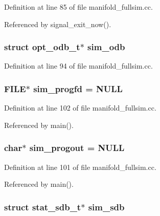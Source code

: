 Definition at line 85 of file manifold\_\-fullsim.cc.

Referenced by signal\_\-exit\_\-now().
\subsubsection[{sim\_\-odb}]{\setlength{\rightskip}{0pt plus 5cm}struct {\bf opt\_\-odb\_\-t}$\ast$ {\bf sim\_\-odb}}\label{manifold__fullsim_8cc_5520d419f4ed203a8f4496330bef06e3}




Definition at line 94 of file manifold\_\-fullsim.cc.
\subsubsection[{sim\_\-progfd}]{\setlength{\rightskip}{0pt plus 5cm}FILE$\ast$ {\bf sim\_\-progfd} = NULL}\label{manifold__fullsim_8cc_f93f90c77918d1b430318725f0f607a8}




Definition at line 102 of file manifold\_\-fullsim.cc.

Referenced by main().
\subsubsection[{sim\_\-progout}]{\setlength{\rightskip}{0pt plus 5cm}char$\ast$ {\bf sim\_\-progout} = NULL}\label{manifold__fullsim_8cc_21fe317600267fa77e054df4355779dc}




Definition at line 101 of file manifold\_\-fullsim.cc.

Referenced by main().
\subsubsection[{sim\_\-sdb}]{\setlength{\rightskip}{0pt plus 5cm}struct {\bf stat\_\-sdb\_\-t}$\ast$ {\bf sim\_\-sdb}}\label{manifold__fullsim_8cc_2f46df2af0ce568e5ae2ea2a78cb006b}




